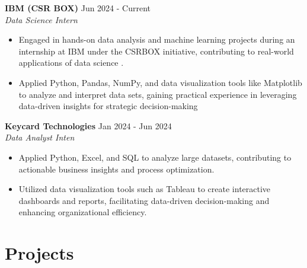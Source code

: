 \documentclass[letterpaper, 10pt]{article}
\newcommand{\bulletSpace}{\vspace{-4pt}}
\newcommand{\secStartSpace}{\vspace{3pt}}
\newcommand{\secEndSpace}{\vspace{5pt}}
\newcommand{\workHeader}[3]{
\noindent \large{\textbf{\textcolor{TextColor}{#1}}} \hfill \normalsize{#3}\vspace{2pt}\\
	\textit{#2}\vspace{-2pt}
}
\begin{document}
\begin{addmargin}[0.5em]{1em}
	\workHeader{IBM (CSR BOX)}{Data Science Intern}{Jun 2024 - Current}
	\begin{itemize}
            \item Engaged in hands-on data analysis and machine learning projects during an internship at IBM under the CSRBOX initiative, contributing to real-world applications of data science .
                \bulletSpace
            \item Applied Python, Pandas, NumPy, and data visualization tools like Matplotlib to analyze and interpret data sets, gaining practical experience in leveraging data-driven insights for strategic decision-making
                
	\end{itemize}
		
	\workHeader{Keycard Technologies}{Data Analyst Inten}{Jan 2024 - Jun 2024}
	\begin{itemize}
            \item Applied Python, Excel, and SQL to analyze large datasets, contributing to actionable business insights and process optimization.
                \bulletSpace
            \item Utilized data visualization tools such as Tableau to create interactive dashboards and reports, facilitating data-driven decision-making and enhancing organizational efficiency.
	\end{itemize}
 \end{addmargin}
\secEndSpace
\section{\color{black} \textbf{Projects}}
\secStartSpace
\end{document}
